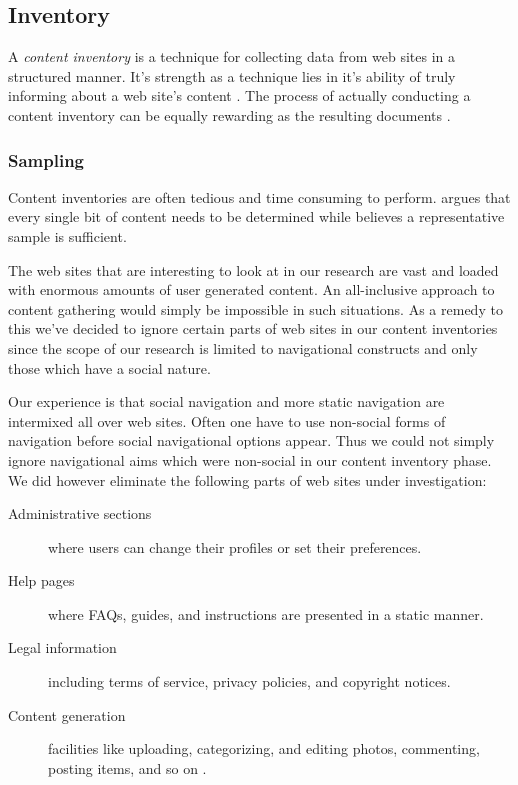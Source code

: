 \subsection{Inventory}

A \emph{content inventory} is a technique for collecting data from web sites
in a structured manner. It's strength as a technique lies in it's ability of
truly informing about a web site's content \citep{wodtke02}. The process of
actually conducting a content inventory can be equally rewarding as the
resulting documents \citep{veen02}.

\subsubsection{Sampling}
\label{section:methodology.content.analysis.sampling}

Content inventories are often tedious and time consuming to perform.
\citet[p.~267]{wodtke02} argues that every single bit of content needs to be
determined while \citet[p.~241]{morville06} believes a representative sample
is sufficient.

The web sites that are interesting to look at in our research are vast and
loaded with enormous amounts of user generated content. An all-inclusive
approach to content gathering would simply be impossible in such situations.
As a remedy to this we've decided to ignore certain parts of web sites in our
content inventories since the scope of our research is limited to navigational
constructs and only those which have a social nature.

Our experience is that social navigation and more static navigation are
intermixed all over web sites. Often one have to use non-social forms of
navigation before social navigational options appear. Thus we could not simply
ignore navigational aims which were non-social in our content inventory phase.
We did however eliminate the following parts of web sites under investigation:

\begin{description}
  \item[Administrative sections] where users can change their profiles or set
    their preferences.
  \item[Help pages] where FAQs, guides, and instructions are presented in a
    static manner.
  \item[Legal information] including terms of service, privacy policies, and
    copyright notices.
  \item[Content generation] facilities like uploading, categorizing, and
    editing photos, commenting, posting items, and so on%
    .
\end{description}


